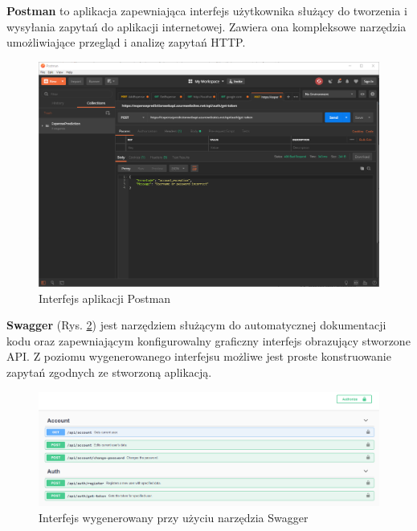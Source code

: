 \textbf{Postman} to aplikacja zapewniająca interfejs użytkownika służący do tworzenia i wysyłania zapytań do aplikacji internetowej. Zawiera ona kompleksowe narzędzia umożliwiające przegląd i analizę zapytań HTTP. \cite{postman}
\begin{figure}[!ht]
	\begin{center}
		\includegraphics[width=6in]{img/aplikacje/postman_interfejs.png}
		\caption{Interfejs aplikacji Postman}
		\label{postman_interfejs}
	\end{center}
\end{figure}

\textbf{Swagger} (Rys. \ref{swagger_interfejs}) jest narzędziem służącym do automatycznej dokumentacji kodu oraz zapewniającym konfigurowalny graficzny interfejs obrazujący stworzone API. Z poziomu wygenerowanego interfejsu możliwe jest proste konstruowanie zapytań zgodnych ze stworzoną aplikacją.\cite{swagger}
\begin{figure}[!ht]
	\begin{center}
		\includegraphics[width=6in]{img/aplikacje/swagger_interfejs.png}
		\caption{Interfejs wygenerowany przy użyciu narzędzia Swagger}
		\label{swagger_interfejs}
	\end{center}
\end{figure}

